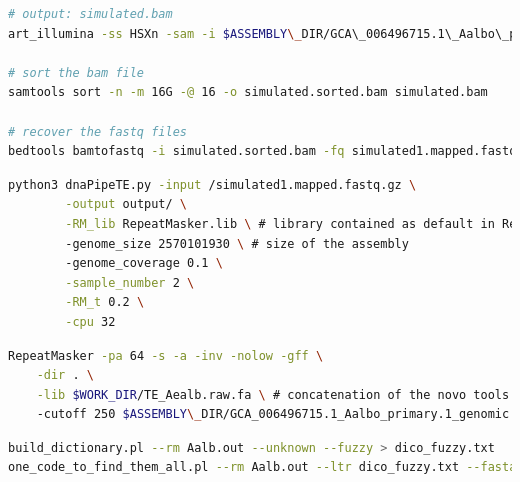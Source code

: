 \documentclass[10pt]{article}
\begin{document}
\vspace{0.5cm}

\begin{lstlisting}[language=bash, frame=trb, caption=Commande \texttt{Simulation \texttt{fastq} files}., label=simulation]
# output: simulated.bam
art_illumina -ss HSXn -sam -i $ASSEMBLY\_DIR/GCA\_006496715.1\_Aalbo\_primary.1\_genomic.fna -p -l 150 -f 20 -m 200 -s 10 -o simulated

# sort the bam file
samtools sort -n -m 16G -@ 16 -o simulated.sorted.bam simulated.bam

# recover the fastq files 
bedtools bamtofastq -i simulated.sorted.bam -fq simulated1.mapped.fastq -fq2 simulated2.mapped.fastq
\end{lstlisting}

\vspace{0.5cm}

\begin{lstlisting}[language=bash, frame=trb, caption=Commande \texttt{dnaPipeTE}., label=dnapipete]
python3 dnaPipeTE.py -input /simulated1.mapped.fastq.gz \
        -output output/ \
        -RM_lib RepeatMasker.lib \ # library contained as default in RepeatMasker
        -genome_size 2570101930 \ # size of the assembly 
        -genome_coverage 0.1 \
        -sample_number 2 \
        -RM_t 0.2 \
        -cpu 32 
\end{lstlisting}

\vspace{0.5cm}

\begin{lstlisting}[language=bash, frame=trb, caption=Commande \texttt{RepeatMasker}., label=repeatmasker]
RepeatMasker -pa 64 -s -a -inv -nolow -gff \
    -dir . \
    -lib $WORK_DIR/TE_Aealb.raw.fa \ # concatenation of the novo tools results and RepBase
    -cutoff 250 $ASSEMBLY\_DIR/GCA_006496715.1_Aalbo_primary.1_genomic.fna
\end{lstlisting}

\vspace{0.5cm}

\begin{lstlisting}[language=bash, frame=trb, caption=Commande \texttt{OneCodeToFindThemAll}., label=octfta]
build_dictionary.pl --rm Aalb.out --unknown --fuzzy > dico_fuzzy.txt
one_code_to_find_them_all.pl --rm Aalb.out --ltr dico_fuzzy.txt --fasta --flanking 100 --strict --unknown --insert 80
\end{lstlisting}

\vspace{0.5cm}
\end{document}
